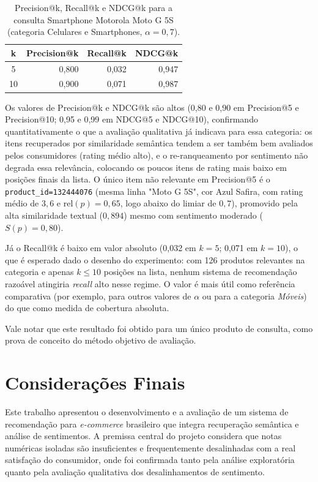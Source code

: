 \documentclass{IEEEtran}
\begin{document}
\begin{table}[htbp]
  \centering
  \caption{Precision@k, Recall@k e NDCG@k para a consulta Smartphone Motorola
  Moto G 5S (categoria Celulares e Smartphones, $\alpha=0{,}7$).}
  \label{tab:objetiva_smartphone}
  \begin{tabular}{crrr}
    \toprule
    \textbf{k} & \textbf{Precision@k} & \textbf{Recall@k} & \textbf{NDCG@k} \\
    \midrule
    5  & 0,800 & 0,032 & 0,947 \\
    10 & 0,900 & 0,071 & 0,987 \\
    \bottomrule
  \end{tabular}
\end{table}

Os valores de Precision@k e NDCG@k são altos (0,80 e 0,90 em Precision@5 e
Precision@10; 0,95 e 0,99 em NDCG@5 e NDCG@10), confirmando quantitativamente o
que a avaliação qualitativa já indicava para essa categoria: os itens
recuperados por similaridade semântica tendem a ser também bem avaliados pelos
consumidores (rating médio alto), e o re-ranqueamento por sentimento não
degrada essa relevância, colocando os poucos itens de rating mais baixo em
posições finais da lista. O único item não relevante em Precision@5 é o
\texttt{product\_id=132444076} (mesma linha "Moto G 5S", cor Azul Safira, com
rating médio de $3{,}6$ e $\text{rel}(p)=0{,}65$, logo abaixo do limiar de
$0{,}7$), promovido pela alta similaridade textual ($0{,}894$) mesmo com
sentimento moderado ($S(p)=0{,}80$).

Já o Recall@k é baixo em valor absoluto (0,032 em $k=5$; 0,071 em $k=10$), o que
é esperado dado o desenho do experimento: com 126 produtos relevantes na
categoria e apenas $k \leq 10$ posições na lista, nenhum sistema de recomendação
razoável atingiria \textit{recall} alto nesse regime. O valor é mais útil como referência
comparativa (por exemplo, para outros valores de $\alpha$ ou para a categoria
\textit{Móveis}) do que como medida de cobertura absoluta.

Vale notar que este resultado foi obtido para um único produto de consulta, como
prova de conceito do método objetivo de avaliação.

\section{Considerações Finais}
\label{sec:conclusion}


Este trabalho apresentou o desenvolvimento e a avaliação de um sistema de recomendação para \textit{e-commerce} brasileiro que integra recuperação semântica e análise de sentimentos. A premissa central do projeto considera que notas numéricas isoladas são insuficientes e frequentemente desalinhadas com a real satisfação do consumidor, onde foi confirmada tanto pela análise exploratória quanto pela avaliação qualitativa dos desalinhamentos de sentimento.
\end{document}
